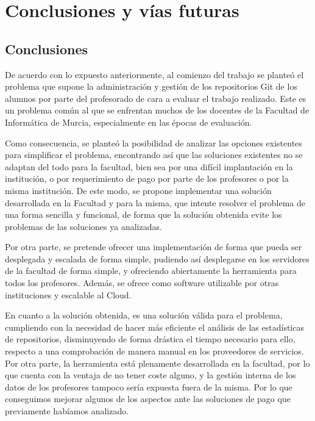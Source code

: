 \chapter{Conclusiones y vías futuras\label{05conclusiones}}

\section{Conclusiones}

De acuerdo con lo expuesto anteriormente, al comienzo del trabajo se
planteó el problema que supone la administración y gestión de los
repositorios Git de los alumnos por parte del profesorado de cara a evaluar
el trabajo realizado. Este es un problema común al que se enfrentan muchos
de los docentes de la Facultad de Informática de Murcia, especialmente en
las épocas de evaluación.

Como consecuencia, se planteó la posibilidad de analizar las opciones
existentes para simplificar el problema, encontrando así que las soluciones
existentes no se adaptan del todo para la facultad, bien sea por una
difícil implantación en la institución, o por requerimiento de pago por
parte de los profesores o por la misma institución. De este modo, se
propone implementar una solución desarrollada en la Facultad y para la
misma, que intente resolver el problema de una forma sencilla y funcional,
de forma que la solución obtenida evite los problemas de las soluciones ya
analizadas.

Por otra parte, se pretende ofrecer una implementación de forma que pueda
ser desplegada y escalada de forma simple, pudiendo así desplegarse en los
servidores de la facultad de forma simple, y ofreciendo abiertamente la
herramienta para todos los profesores. Además, se ofrece como software
utilizable por otras instituciones y escalable al Cloud.

En cuanto a la solución obtenida, es una solución válida para el problema,
cumpliendo con la necesidad de hacer más eficiente el análisis de las
estadísticas de repositorios, disminuyendo de forma drástica el tiempo
necesario para ello, respecto a una comprobación de manera manual en los
proveedores de servicios. Por otra parte, la herramienta está plenamente
desarrollada en la facultad, por lo que cuenta con la ventaja de no tener
coste alguno, y la gestión interna de los datos de los profesores tampoco
sería expuesta fuera de la misma. Por lo que conseguimos mejorar algunos de
los aspectos ante las soluciones de pago que previamente habíamos
analizado.

